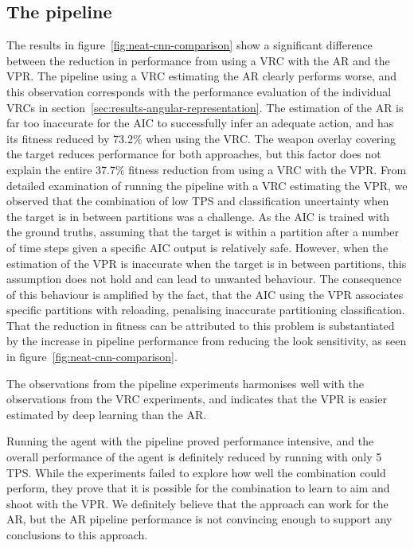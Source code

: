 \subsection{The pipeline}
The results in figure~\ref{fig:neat-cnn-comparison} show a significant difference between the reduction in performance from using a VRC with the AR and the VPR. The pipeline using a VRC estimating the AR clearly performs worse, and this observation corresponds with the performance evaluation of the individual VRCs in section~\ref{sec:results-angular-representation}. The estimation of the AR is far too inaccurate for the AIC to successfully infer an adequate action, and has its fitness reduced by 73.2\% when using the VRC. The weapon overlay covering the target reduces performance for both approaches, but this factor does not explain the entire 37.7\% fitness reduction from using a VRC with the VPR. From detailed examination of running the pipeline with a VRC estimating the VPR, we observed that the combination of low TPS and classification uncertainty when the target is in between partitions was a challenge. As the AIC is trained with the ground truths, assuming that the target is within a partition after a number of time steps given a specific AIC output is relatively safe. However, when the estimation of the VPR is inaccurate when the target is in between partitions, this assumption does not hold and can lead to unwanted behaviour. The consequence of this behaviour is amplified by the fact, that the AIC using the VPR associates specific partitions with reloading, penalising inaccurate partitioning classification. That the reduction in fitness can be attributed to this problem is substantiated by the increase in pipeline performance from reducing the look sensitivity, as seen in figure~\ref{fig:neat-cnn-comparison}.

The observations from the pipeline experiments harmonises well with the observations from the VRC experiments, and indicates that the VPR is easier estimated by deep learning than the AR.

Running the agent with the pipeline proved performance intensive, and the overall performance of the agent is definitely reduced by running with only 5 TPS. While the experiments failed to explore how well the combination could perform, they prove that it is possible for the combination to learn to aim and shoot with the VPR. We definitely believe that the approach can work for the AR, but the AR pipeline performance is not convincing enough to support any conclusions to this approach.

